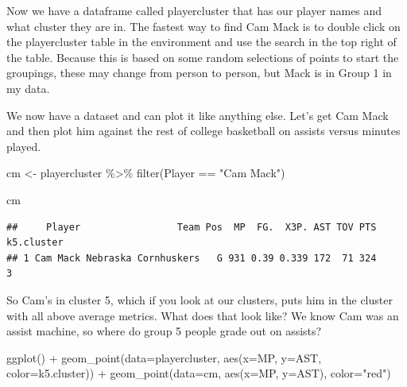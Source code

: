 \documentclass[
]{book}
\newenvironment{Shaded}{\begin{snugshade}}{\end{snugshade}}
\newcommand{\AttributeTok}[1]{\textcolor[rgb]{0.77,0.63,0.00}{#1}}
\newcommand{\FunctionTok}[1]{\textcolor[rgb]{0.00,0.00,0.00}{#1}}
\newcommand{\NormalTok}[1]{#1}
\newcommand{\OtherTok}[1]{\textcolor[rgb]{0.56,0.35,0.01}{#1}}
\newcommand{\SpecialCharTok}[1]{\textcolor[rgb]{0.00,0.00,0.00}{#1}}
\newcommand{\StringTok}[1]{\textcolor[rgb]{0.31,0.60,0.02}{#1}}
\begin{document}
\begin{Shaded}
\end{Shaded}

Now we have a dataframe called playercluster that has our player names and what cluster they are in. The fastest way to find Cam Mack is to double click on the playercluster table in the environment and use the search in the top right of the table. Because this is based on some random selections of points to start the groupings, these may change from person to person, but Mack is in Group 1 in my data.

We now have a dataset and can plot it like anything else. Let's get Cam Mack and then plot him against the rest of college basketball on assists versus minutes played.

\begin{Shaded}
\begin{Highlighting}[]
\NormalTok{cm }\OtherTok{\textless{}{-}}\NormalTok{ playercluster }\SpecialCharTok{\%\textgreater{}\%} \FunctionTok{filter}\NormalTok{(Player }\SpecialCharTok{==} \StringTok{"Cam Mack"}\NormalTok{)}

\NormalTok{cm}
\end{Highlighting}
\end{Shaded}

\begin{verbatim}
##     Player                 Team Pos  MP  FG.  X3P. AST TOV PTS k5.cluster
## 1 Cam Mack Nebraska Cornhuskers   G 931 0.39 0.339 172  71 324          3
\end{verbatim}

So Cam's in cluster 5, which if you look at our clusters, puts him in the cluster with all above average metrics. What does that look like? We know Cam was an assist machine, so where do group 5 people grade out on assists?

\begin{Shaded}
\begin{Highlighting}[]
\FunctionTok{ggplot}\NormalTok{() }\SpecialCharTok{+} 
  \FunctionTok{geom\_point}\NormalTok{(}\AttributeTok{data=}\NormalTok{playercluster, }\FunctionTok{aes}\NormalTok{(}\AttributeTok{x=}\NormalTok{MP, }\AttributeTok{y=}\NormalTok{AST, }\AttributeTok{color=}\NormalTok{k5.cluster)) }\SpecialCharTok{+} 
  \FunctionTok{geom\_point}\NormalTok{(}\AttributeTok{data=}\NormalTok{cm, }\FunctionTok{aes}\NormalTok{(}\AttributeTok{x=}\NormalTok{MP, }\AttributeTok{y=}\NormalTok{AST), }\AttributeTok{color=}\StringTok{"red"}\NormalTok{)}
\end{Highlighting}
\end{Shaded}
\end{document}
